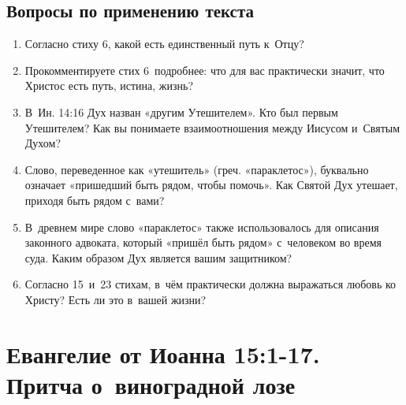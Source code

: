 \documentclass[a4paper,12pt]{article}
\begin{document}
\subsection*{Вопросы по применению текста} 
\begin{enumerate}
    \item Согласно стиху 6, какой есть единственный путь к~Отцу? 
    
    \myline
    
    \myline
    \item Прокомментируете стих 6~подробнее: что для вас практически значит, что Христос есть путь, истина, жизнь? 
    
    \myline
    
    \myline
    \item В~Ин. 14:16 Дух назван «другим Утешителем». Кто был первым Утешителем? Как вы понимаете взаимоотношения между Иисусом и~Святым Духом? 
    
    \myline
    
    \myline
    \item Слово, переведенное как «утешитель» (греч. «параклетос»), буквально означает «пришедший быть рядом, чтобы помочь». Как Святой Дух утешает, приходя быть рядом с~вами? 
    
    \myline
    
    \myline
    \item В~древнем мире слово «параклетос» также использовалось для описания законного адвоката, который «пришёл быть рядом» с~человеком во время суда. Каким образом Дух является вашим защитником? 
    
    \myline
    
    \myline
    \item Согласно 15~и~23 стихам, в~чём практически должна выражаться любовь ко Христу? Есть ли это в~вашей жизни?
    
    \myline
    
    \myline
\end{enumerate}



\section{Евангелие от Иоанна 15:1-17. Притча о~виноградной лозе}
\end{document}
